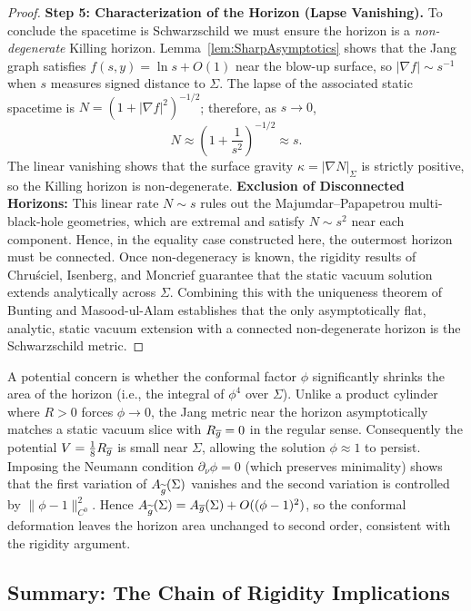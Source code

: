 \begin{proof}
\textbf{Step 5: Characterization of the Horizon (Lapse Vanishing).}
To conclude the spacetime is Schwarzschild we must ensure the horizon is a \emph{non-degenerate} Killing horizon. Lemma~\ref{lem:SharpAsymptotics} shows that the Jang graph satisfies $f(s,y) = \ln s + O(1)$ near the blow-up surface, so $|\nabla f| \sim s^{-1}$ when $s$ measures signed distance to $\Sigma$. The lapse of the associated static spacetime is $N = (1+|\nabla f|^2)^{-1/2}$; therefore, as $s \to 0$,
\[
    N \approx \left(1 + \frac{1}{s^2}\right)^{-1/2} \approx s.
\]
The linear vanishing shows that the surface gravity $\kappa = |\nabla N|_{\Sigma}$ is strictly positive, so the Killing horizon is non-degenerate.
\textbf{Exclusion of Disconnected Horizons:} This linear rate $N \sim s$ rules out the Majumdar--Papapetrou multi-black-hole geometries, which are extremal and satisfy $N \sim s^2$ near each component. Hence, in the equality case constructed here, the outermost horizon must be connected.
Once non-degeneracy is known, the rigidity results of Chru\'sciel, Isenberg, and Moncrief \cite{chrusciel1990} guarantee that the static vacuum solution extends analytically across $\Sigma$. Combining this with the uniqueness theorem of Bunting and Masood-ul-Alam establishes that the only asymptotically flat, analytic, static vacuum extension with a connected non-degenerate horizon is the Schwarzschild metric.
\end{proof}

\begin{remark}
A potential concern is whether the conformal factor $\phi$ significantly shrinks the area of the horizon (i.e., the integral of $\phi^4$ over $\Sigma$). Unlike a product cylinder where $R>0$ forces $\phi \to 0$, the Jang metric near the horizon asymptotically matches a static vacuum slice with $R_{\overline{g}}=0$ in the regular sense. Consequently the potential $V = \tfrac{1}{8}R_{\overline{g}}$ is small near $\Sigma$, allowing the solution $\phi \approx 1$ to persist. Imposing the Neumann condition $\partial_\nu \phi = 0$ (which preserves minimality) shows that the first variation of $A_{\widetilde{g}}(\Sigma)$ vanishes and the second variation is controlled by $\|\phi-1\|_{C^0}^2$. Hence $A_{\widetilde{g}}(\Sigma) = A_{\overline{g}}(\Sigma) + O((\phi-1)^2)$, so the conformal deformation leaves the horizon area unchanged to second order, consistent with the rigidity argument.
\end{remark}

\subsection{Summary: The Chain of Rigidity Implications}


